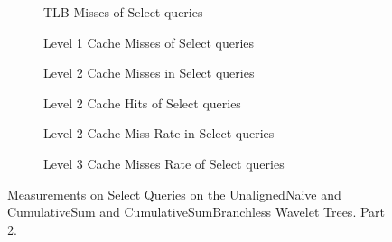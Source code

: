 \begin{figure}\tiny

\begin{subfigure}{0.48\textwidth}
	
	\caption{TLB Misses of Select queries}
	\label{fig:CumulativeSumSelectTLBMiss}
\end{subfigure}
\hfill
\begin{subfigure}{0.48\textwidth}
	
	\caption{Level 1 Cache Misses of Select queries}
	\label{fig:CumulativeSumSelectL1CM}
\end{subfigure}

\begin{subfigure}{0.48\textwidth}
	
	\caption{Level 2 Cache Misses in Select queries}
	\label{fig:CumulativeSumSelectL2CM}
\end{subfigure}
\hfill
\begin{subfigure}{0.48\textwidth}
	
	\caption{Level 2 Cache Hits of Select queries}
	\label{fig:CumulativeSumSelectL2CHits}
\end{subfigure}

\begin{subfigure}{0.48\textwidth}
	
	\caption{Level 2 Cache Miss Rate in Select queries}
	\label{fig:CumulativeSumSelectL2CMRate}
\end{subfigure}
\hfill
\begin{subfigure}{0.48\textwidth}
	
	\caption{Level 3 Cache Misses Rate of Select queries}
	\label{fig:CumulativeSumSelectL3CM}
\end{subfigure}

\caption{Measurements on Select Queries on the UnalignedNaive and CumulativeSum and CumulativeSumBranchless Wavelet Trees. Part 2.}
\label{fig:CumulativeSumSelect}
\end{figure}






\restoregeometry














